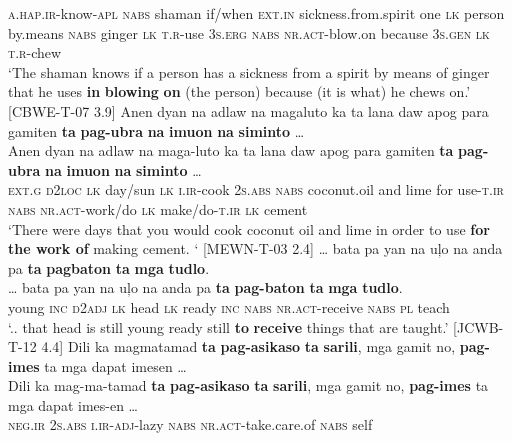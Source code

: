 \textsc{a.hap.ir}-know-\textsc{apl}  \textsc{nabs}  shaman  if/when  \textsc{ext.in}  sickness.from.spirit
one  \textsc{lk}  person  by.means  \textsc{nabs}  ginger  \textsc{lk}  \textsc{t.r}-use  3\textsc{s.erg}  \textsc{nabs}
\textsc{nr.act}-blow.on  because  3\textsc{s.gen}  \textsc{lk}  \textsc{t.r}-chew \\
\glt `The shaman knows if a person has a sickness from a spirit by means of ginger that he uses \textbf{in} \textbf{blowing} \textbf{on} (the person) because (it is what) he chews on.’ [CBWE-T-07 3.9]
\z
\ea
Anen  dyan  na  adlaw  na  magaluto  ka  ta  lana  daw apog  para  gamiten  \textbf{ta}  \textbf{pag-ubra}  \textbf{na}  \textbf{imuon} \textbf{na}  \textbf{siminto} … \smallskip\\
\gll Anen  dyan  na  adlaw  na  maga-luto  ka  ta  lana  daw apog  para  gamiten  \textbf{ta}  \textbf{pag-ubra}  \textbf{na}  \textbf{imuon} \textbf{na}  \textbf{siminto} … \\
\textsc{ext.g}  \textsc{d}2\textsc{loc}  \textsc{lk}  day/sun  \textsc{lk}  \textsc{i.ir}-cook  2\textsc{s.abs}  \textsc{nabs}  coconut.oil  and lime  for  use-\textsc{t.ir}  \textsc{nabs}  \textsc{nr.act}-work/do  \textsc{lk}  make/do-\textsc{t.ir}
\textsc{lk}  cement \\
\glt `There were days that you would cook coconut oil and lime in order to use \textbf{for the work of} making cement. ‘ [MEWN-T-03 2.4]
\z
\ea
… bata  pa  yan  na  uļo  na  anda  pa  \textbf{ta}  \textbf{pagbaton} \textbf{ta}  \textbf{mga}  \textbf{tudlo}. \smallskip\\
\gll … bata  pa  yan  na  uļo  na  anda  pa  \textbf{ta}  \textbf{pag-baton} \textbf{ta}  \textbf{mga}  \textbf{tudlo}. \\
{} young  \textsc{inc}  \textsc{d2adj}  \textsc{lk}  head  \textsc{lk}  ready  \textsc{inc}  \textsc{nabs}  \textsc{nr.act}-receive
\textsc{nabs}  \textsc{pl}  teach \\
\glt ‘.. that head is still young ready still \textbf{to} \textbf{receive} things that are taught.’ [JCWB-T-12 4.4]
\z
\ea
Dili  ka  magmatamad  \textbf{ta}    \textbf{pag-asikaso}  \textbf{ta}  \textbf{sarili}, mga  gamit  no,  \textbf{pag-imes}  ta  mga  dapat  imesen … \smallskip\\
\gll Dili  ka  mag-ma-tamad  \textbf{ta}    \textbf{pag-asikaso}  \textbf{ta}  \textbf{sarili}\footnotemark{}, mga  gamit  no,  \textbf{pag-imes}  ta  mga  dapat  imes-en … \\
\textsc{neg.ir}  2\textsc{s.abs}  \textsc{i.ir}-\textsc{adj-}lazy    \textsc{nabs}  \textsc{nr.act}-take.care.of  \textsc{nabs}  self
